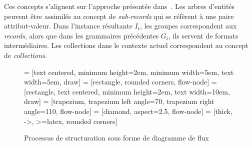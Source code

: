 Ces concepts s'alignent sur l'approche présentée dans~\cite{barretGenericAbstractionsData2021}.
Les arbres d'entités peuvent être assimilés au concept de \emph{sub-records} qui se réfèrent à une paire attribut-valeur.
Dans l'instance résultante $I_t$, les groupes correspondent aux \emph{records}, alors que dans les grammaires précédentes $G_i$, ils servent de formats intermédiaires.
Les collections dans le contexte actuel correspondent au concept de \emph{collections}.

\begin{figure}[H]
    \centering
     = [text centered, minimum height=2em, minimum width=5em, text width=5em, draw]
     = [rectangle, rounded corners, flow-node]
     = [rectangle, text centered, minimum height=2em, text width=10em, draw]
     = [trapezium, trapezium left angle=70, trapezium right angle=110, flow-node]
     = [diamond, aspect=2.5, flow-node]
     = [thick, ->, >=latex, rounded corners]

    \begin{adjustbox}{max width=\linewidth,max height=.95\textheight,valign=c}
    \end{adjustbox}

    \caption{Processus de structuration sous forme de diagramme de flux}
\end{figure}

